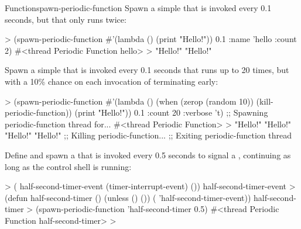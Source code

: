 \begin{functiondoc}{Function}{spawn-periodic-function}
\fnexamples 
Spawn a simple  that is invoked every 0.1 seconds,
but that only runs twice:
%
\W\supp
\begin{example}
  > (spawn-periodic-function #'(lambda () (print "Hello!")) 0.1 
      :name 'hello
      :count 2)
  #<thread Periodic Function hello>
  >
  "Hello!" 
  "Hello!" 
\end{example}
%
%
%
Spawn a simple  that is invoked every 0.1 seconds
that runs up to 20 times, but with a 10\% chance on each invocation of
terminating early:
%
\W\supp\notpretop
\begin{example}
  > (spawn-periodic-function 
       #'(lambda ()
           (when (zerop (random 10))
             (kill-periodic-function))
           (print "Hello!")) 
       0.1
       :count 20
       :verbose 't)
  ;; Spawning periodic-function thread for...
  #<thread Periodic Function>
  >
  "Hello!" 
  "Hello!" 
  "Hello!" 
  "Hello!" 
  ;; Killing periodic-function...
  ;; Exiting periodic-function thread
\end{example}
%
%
%
%
%
%
Define and spawn a  that is invoked every 0.5 seconds
to signal a , continuing as long as
the control shell is running:
%
\W\supp\notpretop
\begin{example}
  > ( half-second-timer-event (timer-interrupt-event)
      ())
  half-second-timer-event
  > (defun half-second-timer ()
      (unless ()
        ())
      ( 'half-second-timer-event))
  half-second-timer
  > (spawn-periodic-function 'half-second-timer 0.5)
  #<thread Periodic Function half-second-timer>
  >
\end{example}

\end{functiondoc}


